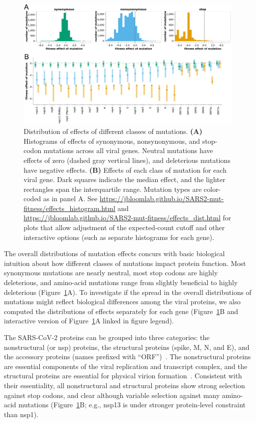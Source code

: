 \documentclass[9pt,twocolumn,twoside]{gsajnl_modified}
\begin{document}
\begin{figure}
\includegraphics[width=\linewidth]{figs/dist.pdf}
\caption{
Distribution of effects of different classes of mutations.
{\bf (A)}
Histograms of effects of synonymous, nonsynonymous, and stop-codon mutations across all viral genes.
Neutral mutations have effects of zero (dashed gray vertical lines), and deleterious mutations have negative effects.
{\bf (B)}
Effects of each class of mutation for each viral gene.
Dark squares indicate the median effect, and the lighter rectangles span the interquartile range.
Mutation types are color-coded as in panel A.
See \url{https://jbloomlab.github.io/SARS2-mut-fitness/effects_histogram.html} and \url{https://jbloomlab.github.io/SARS2-mut-fitness/effects_dist.html} for plots that allow adjustment of the expected-count cutoff and other interactive options (such as separate histograms for each gene).
\label{fig:dist}
}
\end{figure}

The overall distributions of mutation effects concurs with basic biological intuition about how different classes of mutations impact protein function.
Most synonymous mutations are nearly neutral, most stop codons are highly deleterious, and amino-acid mutations range from slightly beneficial to highly deleterious (Figure~\ref{fig:dist}A).
To investigate if the spread in the overall distributions of mutations might reflect biological differences among the viral proteins, we also computed the distributions of effects separately for each gene (Figure~\ref{fig:dist}B and interactive version of Figure~\ref{fig:dist}A linked in figure legend).

The SARS-CoV-2 proteins can be grouped into three categories: the nonstructural (or nsp) proteins, the structural proteins (spike, M, N, and E), and the accessory proteins (names prefixed with ``ORF'')~\citep{v2021coronavirus}.
The nonstructural proteins are essential components of the viral replication and transcript complex, and the structural proteins are essential for physical virion formation~\citep{v2021coronavirus}.
Consistent with their essentiality, all nonstructural and structural proteins show strong selection against stop codons, and clear although variable selection against many amino-acid mutations (Figure~\ref{fig:dist}B; e.g., nsp13 is under stronger protein-level constraint than nsp1).
\end{document}
